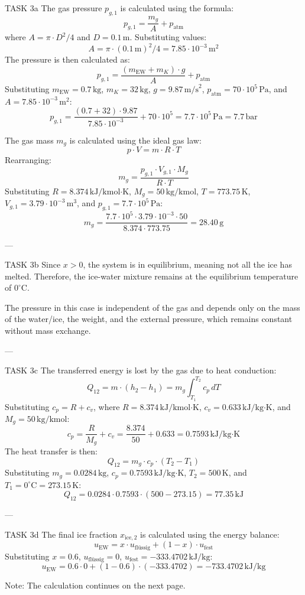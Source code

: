 TASK 3a  
The gas pressure \( p_{g,1} \) is calculated using the formula:  
\[
p_{g,1} = \frac{m_g}{A} + p_{\text{atm}}
\]  
where \( A = \pi \cdot D^2 / 4 \) and \( D = 0.1 \, \text{m} \). Substituting values:  
\[
A = \pi \cdot (0.1 \, \text{m})^2 / 4 = 7.85 \cdot 10^{-3} \, \text{m}^2
\]  
The pressure is then calculated as:  
\[
p_{g,1} = \frac{(m_{\text{EW}} + m_K) \cdot g}{A} + p_{\text{atm}}
\]  
Substituting \( m_{\text{EW}} = 0.7 \, \text{kg} \), \( m_K = 32 \, \text{kg} \), \( g = 9.87 \, \text{m/s}^2 \), \( p_{\text{atm}} = 70 \cdot 10^5 \, \text{Pa} \), and \( A = 7.85 \cdot 10^{-3} \, \text{m}^2 \):  
\[
p_{g,1} = \frac{(0.7 + 32) \cdot 9.87}{7.85 \cdot 10^{-3}} + 70 \cdot 10^5 = 7.7 \cdot 10^5 \, \text{Pa} = 7.7 \, \text{bar}
\]  

The gas mass \( m_g \) is calculated using the ideal gas law:  
\[
p \cdot V = m \cdot R \cdot T
\]  
Rearranging:  
\[
m_g = \frac{p_{g,1} \cdot V_{g,1} \cdot M_g}{R \cdot T}
\]  
Substituting \( R = 8.374 \, \text{kJ/kmol·K} \), \( M_g = 50 \, \text{kg/kmol} \), \( T = 773.75 \, \text{K} \), \( V_{g,1} = 3.79 \cdot 10^{-3} \, \text{m}^3 \), and \( p_{g,1} = 7.7 \cdot 10^5 \, \text{Pa} \):  
\[
m_g = \frac{7.7 \cdot 10^5 \cdot 3.79 \cdot 10^{-3} \cdot 50}{8.374 \cdot 773.75} = 28.40 \, \text{g}
\]  

---

TASK 3b  
Since \( x > 0 \), the system is in equilibrium, meaning not all the ice has melted. Therefore, the ice-water mixture remains at the equilibrium temperature of \( 0^\circ\text{C} \).  

The pressure in this case is independent of the gas and depends only on the mass of the water/ice, the weight, and the external pressure, which remains constant without mass exchange.  

---

TASK 3c  
The transferred energy is lost by the gas due to heat conduction:  
\[
Q_{12} = m \cdot (h_2 - h_1) = m_g \int_{T_1}^{T_2} c_p \, dT
\]  
Substituting \( c_p = R + c_v \), where \( R = 8.374 \, \text{kJ/kmol·K} \), \( c_v = 0.633 \, \text{kJ/kg·K} \), and \( M_g = 50 \, \text{kg/kmol} \):  
\[
c_p = \frac{R}{M_g} + c_v = \frac{8.374}{50} + 0.633 = 0.7593 \, \text{kJ/kg·K}
\]  
The heat transfer is then:  
\[
Q_{12} = m_g \cdot c_p \cdot (T_2 - T_1)
\]  
Substituting \( m_g = 0.0284 \, \text{kg} \), \( c_p = 0.7593 \, \text{kJ/kg·K} \), \( T_2 = 500 \, \text{K} \), and \( T_1 = 0^\circ\text{C} = 273.15 \, \text{K} \):  
\[
Q_{12} = 0.0284 \cdot 0.7593 \cdot (500 - 273.15) = 77.35 \, \text{kJ}
\]  

---

TASK 3d  
The final ice fraction \( x_{\text{ice},2} \) is calculated using the energy balance:  
\[
u_{\text{EW}} = x \cdot u_{\text{flüssig}} + (1 - x) \cdot u_{\text{fest}}
\]  
Substituting \( x = 0.6 \), \( u_{\text{flüssig}} = 0 \), \( u_{\text{fest}} = -333.4702 \, \text{kJ/kg} \):  
\[
u_{\text{EW}} = 0.6 \cdot 0 + (1 - 0.6) \cdot (-333.4702) = -733.4702 \, \text{kJ/kg}
\]  

Note: The calculation continues on the next page.